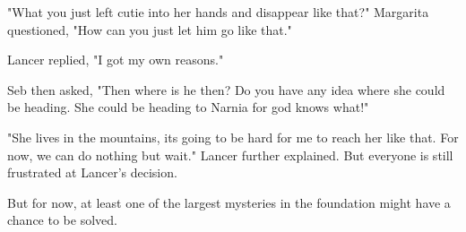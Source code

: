 "What you just left cutie into her hands and disappear like that?" Margarita questioned, "How can you just let him go like that."

Lancer replied, "I got my own reasons."

Seb then asked, "Then where is he then? Do you have any idea where she could be heading. She could be heading to Narnia for god knows what!"

"She lives in the mountains, its going to be hard for me to reach her like that. For now, we can do nothing but wait." Lancer further explained. But everyone is still frustrated at Lancer's decision.

But for now, at least one of the largest mysteries in the foundation might have a chance to be solved.
